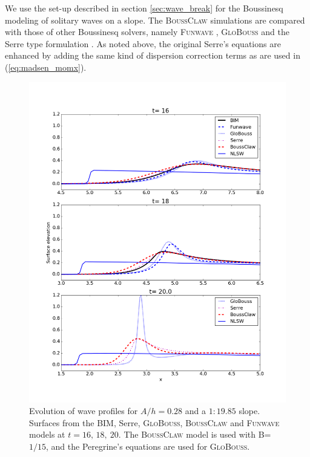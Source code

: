 \documentclass[review]{elsarticle}
\newcommand{\BoussClaw}{\textsc{BoussClaw} }
\begin{document}
We use the set-up described in section \ref{sec:wave_break} for the Boussinesq modeling of solitary waves on a slope. 
The \BoussClaw simulations are compared
with those of other Boussinesq solvers, namely
 \textsc{Funwave} \citep{shi2012high}, \textsc{GloBouss} \citep{lovholt2010coupling} and the Serre type formulation \citep{Lovholt:2013a}.
As noted above, 
the original Serre's equations are enhanced by adding the same kind of dispersion correction terms as are used in 
(\ref{eq:madsen_momx}). 


\begin{figure}[tbh!]
\centering
\includegraphics[width=.9\textwidth]{_fig/bim_boussclaw_fun_glob.png}
\caption{Evolution of wave profiles for $A/h=0.28$ and a $1:19.85$ slope. 
Surfaces from the BIM, Serre, \textsc{GloBouss}, \BoussClaw
and \textsc{Funwave} models at $t = 16,\, 18,\ 20$.
The \BoussClaw model is used with B=$1/15$,
and the Peregrine's equations are used for \textsc{GloBouss}.}
\label{fig:bim_boussclaw_fun}
\end{figure}
\end{document}
